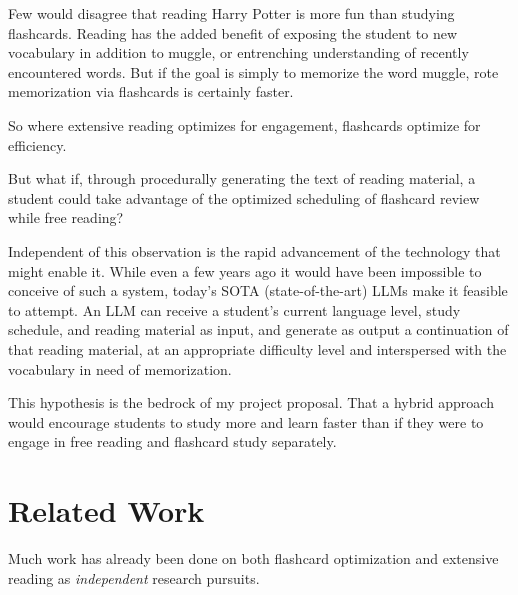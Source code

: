 \documentclass[
	letterpaper, %
]{jdf}
\begin{document}
Few would disagree that reading Harry Potter is more fun than studying flashcards. Reading has the added benefit of exposing the student to new vocabulary in addition to muggle, or entrenching understanding of recently encountered words. But if the goal is simply to memorize the word muggle, rote memorization via flashcards is certainly faster.

So where extensive reading optimizes for engagement, flashcards optimize for efficiency. 

But what if, through procedurally generating the text of reading material, a student could take advantage of the optimized scheduling of flashcard review while free reading?

Independent of this observation is the rapid advancement of the technology that might enable it. While even a few years ago it would have been impossible to conceive of such a system, today's SOTA (state-of-the-art) LLMs make it feasible to attempt. An LLM can receive a student's current language level, study schedule, and reading material as input, and generate as output a continuation of that reading material, at an appropriate difficulty level and interspersed with the vocabulary in need of memorization.

This hypothesis is the bedrock of my project proposal. That a hybrid approach would encourage students to study more and learn faster than if they were to engage in free reading and flashcard study separately.

\section{Related Work}

Much work has already been done on both flashcard optimization and extensive reading as \textit{independent} research pursuits.
\end{document}
